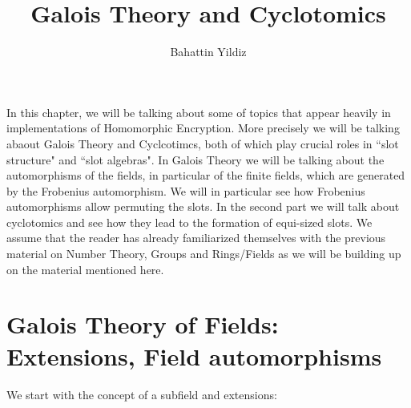 \documentclass[12pt]{article}
\title{Galois Theory and Cyclotomics}
\author{Bahattin Yildiz }
\theoremstyle{plain}
\theoremstyle{definition}
\theoremstyle{remark}
\begin{document}
\date{}

\maketitle
In this chapter, we will be talking about some of topics that appear heavily in implementations of Homomorphic Encryption. More precisely we will be talking abaout Galois Theory and Cyclcotimcs, both of which play crucial roles in ``slot structure" and ``slot algebras". In Galois Theory we will be talking about the automorphisms of the fields, in particular of the finite fields, which are generated by the Frobenius automorphism. We will in particular see how Frobenius automorphisms allow permuting the slots. In the second part we will talk about cyclotomics and see how they lead to the formation of equi-sized slots. We assume that the reader has already familiarized themselves with the previous material on Number Theory, Groups and Rings/Fields as we will be building up on the material mentioned here.


 \section{Galois Theory of Fields: Extensions, Field automorphisms}
We start with the concept of a subfield and extensions:
\end{document}
